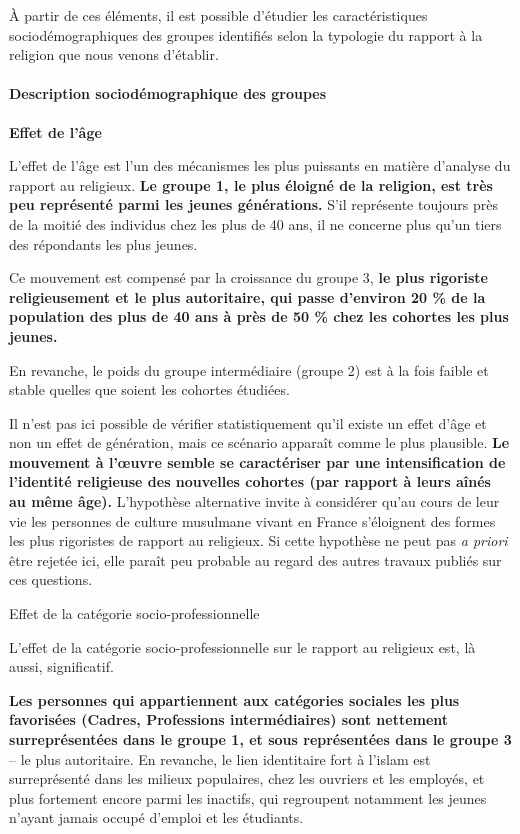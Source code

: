 À partir de ces éléments, il est possible d'étudier les caractéristiques
sociodémographiques des groupes identifiés selon la typologie du rapport
à la religion que nous venons d'établir.


\paragraph{Description sociodémographique des groupes}


\textbf{Effet de l'âge}

L'effet de l'âge est l'un des mécanismes les plus puissants en matière
d'analyse du rapport au religieux. \textbf{Le groupe 1, le plus éloigné
de la religion, est très peu représenté parmi les jeunes générations.}
S'il représente toujours près de la moitié des individus chez les plus
de 40 ans, il ne concerne plus qu'un tiers des répondants les plus
jeunes.

Ce mouvement est compensé par la croissance du groupe 3, \textbf{le plus
rigoriste religieusement et le plus autoritaire, qui passe d'environ 20
\% de la population des plus de 40 ans à près de 50 \% chez les cohortes
les plus jeunes.}

En revanche, le poids du groupe intermédiaire (groupe 2) est à la fois
faible et stable quelles que soient les cohortes étudiées.






Il n'est pas ici possible de vérifier statistiquement qu'il existe un
effet d'âge et non un effet de génération, mais ce scénario apparaît
comme le plus plausible. \textbf{Le mouvement à l'œuvre semble se
caractériser par une intensification de l'identité religieuse des
nouvelles cohortes (par rapport à leurs aînés au même âge).} L'hypothèse
alternative invite à considérer qu'au cours de leur vie les personnes de
culture musulmane vivant en France s'éloignent des formes les plus
rigoristes de rapport au religieux. Si cette hypothèse ne peut pas
\emph{a priori} être rejetée ici, elle paraît peu probable au regard des
autres travaux publiés sur ces questions.


Effet de la catégorie socio-professionnelle


L'effet de la catégorie socio-professionnelle sur le rapport au
religieux est, là aussi, significatif.

\textbf{Les personnes qui appartiennent aux catégories sociales les plus
favorisées (Cadres, Professions intermédiaires) sont nettement
surreprésentées dans le groupe 1, et sous représentées dans le groupe 3}
-- le plus autoritaire. En revanche, le lien identitaire fort à l'islam
est surreprésenté dans les milieux populaires, chez les ouvriers et les
employés, et plus fortement encore parmi les inactifs, qui regroupent
notamment les jeunes n'ayant jamais occupé d'emploi et les étudiants.

